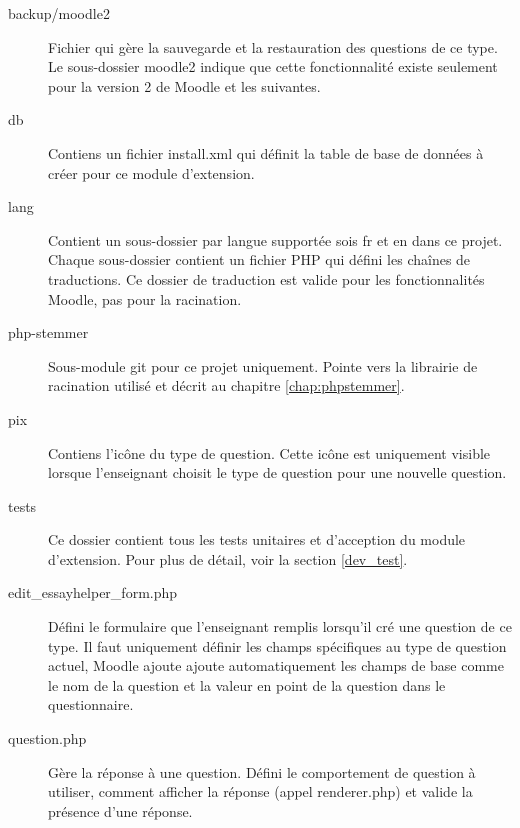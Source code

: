 \begin{description}
 \item[backup/moodle2]
 
 Fichier qui g\`ere la sauvegarde et la restauration des questions de ce type.
 Le sous-dossier moodle2 indique que cette fonctionnalit\'e existe seulement pour la version 2 de Moodle et les suivantes.
 
 \item[db]
 
 Contiens un fichier \og install.xml \fg{} qui d\'efinit la table de base de donn\'ees \`a cr\'eer pour ce module d'extension.
 
 \item[lang]
 
 Contient un sous-dossier par langue support\'ee sois \og fr \fg{} et \og en \fg{} dans ce projet.
 Chaque sous-dossier contient un fichier PHP qui d\'efini les cha\^ines de traductions.
 Ce dossier de traduction est valide pour les fonctionnalit\'es Moodle, pas pour la racination.
 
 \item[php-stemmer]
 
 Sous-module git pour ce projet uniquement.
 Pointe vers la librairie de racination utilis\'e et d\'ecrit au chapitre \ref{chap:phpstemmer}.
 
 \item[pix]
 
 Contiens l'icône du type de question.
 Cette icône est uniquement visible lorsque l'enseignant choisit le type de question pour une nouvelle question.
 
 \item[tests]
 
 Ce dossier contient tous les tests unitaires et d'acception du module d'extension.
 Pour plus de d\'etail, voir la section \ref{dev_test}.
 
 \item[edit\_essayhelper\_form.php]
 
 D\'efini le formulaire que l'enseignant remplis lorsqu'il cr\'e une question de ce type.
 Il faut uniquement d\'efinir les champs sp\'ecifiques au type de question actuel, Moodle ajoute ajoute automatiquement les champs de base comme le nom de la question et la valeur en point de la question dans le questionnaire.
 
 \item[question.php]
 
 G\`ere la r\'eponse \`a une question.
 D\'efini le comportement de question \`a utiliser, comment afficher la r\'eponse (appel renderer.php) et valide la pr\'esence d'une r\'eponse.
 

\end{description}
